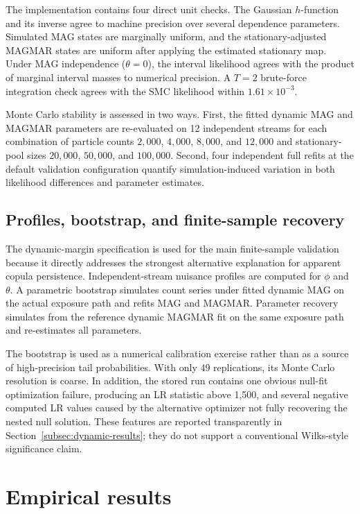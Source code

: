 \documentclass[11pt]{article}
\theoremstyle{definition}
\begin{document}
The implementation contains four direct unit checks. The Gaussian $h$-function and
its inverse agree to machine precision over several dependence parameters. Simulated
MAG states are marginally uniform, and the stationary-adjusted MAGMAR states are
uniform after applying the estimated stationary map. Under MAG independence
($\theta=0$), the interval likelihood agrees with the product of marginal interval
masses to numerical precision. A $T=2$ brute-force integration check agrees with the
SMC likelihood within $1.61\times10^{-3}$.

Monte Carlo stability is assessed in two ways. First, the fitted dynamic MAG and
MAGMAR parameters are re-evaluated on 12 independent streams for each combination of
particle counts $2{,}000$, $4{,}000$, $8{,}000$, and $12{,}000$ and stationary-pool
sizes $20{,}000$, $50{,}000$, and $100{,}000$. Second, four independent full refits
at the default validation configuration quantify simulation-induced variation in
both likelihood differences and parameter estimates.

\subsection{Profiles, bootstrap, and finite-sample recovery}

The dynamic-margin specification is used for the main finite-sample validation
because it directly addresses the strongest alternative explanation for apparent
copula persistence. Independent-stream nuisance profiles are computed for $\phi$ and
$\theta$. A parametric bootstrap simulates count series under fitted dynamic MAG on
the actual exposure path and refits MAG and MAGMAR. Parameter recovery simulates
from the reference dynamic MAGMAR fit on the same exposure path and re-estimates all
parameters.

The bootstrap is used as a numerical calibration exercise rather than as a source of
high-precision tail probabilities. With only 49 replications, its Monte Carlo
resolution is coarse. In addition, the stored run contains one obvious null-fit
optimization failure, producing an LR statistic above 1,500, and several negative
computed LR values caused by the alternative optimizer not fully recovering the
nested null solution. These features are reported transparently in
Section~\ref{subsec:dynamic-results}; they do not support a conventional Wilks-style
significance claim.

\section{Empirical results}
\label{sec:results}
\end{document}
